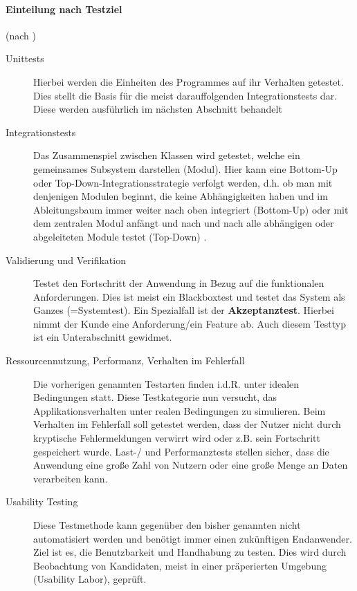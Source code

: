 \paragraph{Einteilung nach Testziel} (nach \citep[S. 238ff]{hunt_pragmatic_1999})
\begin{description}
 \item[Unittests] Hierbei werden die Einheiten des Programmes auf ihr Verhalten getestet. Dies stellt die Basis für die meist darauffolgenden Integrationstests dar. Diese werden ausführlich im nächsten Abschnitt behandelt
 \item[Integrationstests] Das Zusammenspiel zwischen Klassen wird getestet, welche ein gemeinsames Subsystem darstellen (Modul). Hier kann eine Bottom-Up oder Top-Down\hyp{}Integrationsstrategie verfolgt werden, d.h. ob man mit denjenigen Modulen beginnt, die keine Abhängigkeiten haben und im Ableitungsbaum immer weiter nach oben integriert (Bottom-Up) oder mit dem zentralen Modul anfängt und nach und nach alle abhängigen oder abgeleiteten Module testet (Top-Down) \citep{liggesmeyer_modultest_1990}.
 \item[Validierung und Verifikation] Testet den Fortschritt der Anwendung in Bezug auf die funktionalen Anforderungen. Dies ist meist ein Blackboxtest und testet das System als Ganzes (=Systemtest). Ein Spezialfall ist der \textbf{Akzeptanztest}. Hierbei nimmt der Kunde eine Anforderung/ein Feature ab. Auch diesem Testtyp ist ein Unterabschnitt gewidmet.
 \item[Ressourcennutzung, Performanz, Verhalten im Fehlerfall] Die vorherigen genannten Testarten finden i.d.R. unter idealen Bedingungen statt. Diese Testkategorie nun versucht, das Applikationsverhalten unter realen Bedingungen zu simulieren. Beim Verhalten im Fehlerfall soll getestet werden, dass der Nutzer nicht durch kryptische Fehlermeldungen verwirrt wird oder z.B. sein Fortschritt gespeichert wurde. Last-/ und Performanztests stellen sicher, dass die Anwendung eine große Zahl von Nutzern oder eine große Menge an Daten verarbeiten kann.
 \item[Usability Testing] Diese Testmethode kann gegenüber den bisher genannten nicht automatisiert werden und benötigt immer einen zukünftigen Endanwender. Ziel ist es, die Benutzbarkeit und Handhabung zu testen. Dies wird durch Beobachtung von Kandidaten, meist in einer präperierten Umgebung (Usability Labor), geprüft.
\end{description}

